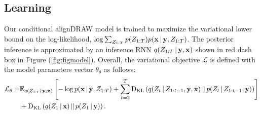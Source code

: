 \documentclass{article} %
\newcommand{\given}{\,|\,}
\newcommand{\expectation}{\mathbb{E}}
\newcommand{\kldiv}{\mathrm{D}_{\rm KL}}
\newcommand{\klBars}{\,\|\,}
\newcommand{\Lat}{Z}
\newcommand{\icaption}{{\bf{y}}}
\newcommand{\oimage}{{\bf{x}}}
\newcommand{\post}{q}
\newcommand{\prior}{p}
\newcommand{\loss}{\mathcal{L}}
\begin{document}
\subsection{Learning}

Our conditional alignDRAW model is trained to maximize the variational lower bound on the log-likelihood, $\log \sum_{\Lat_{1:T}} \prior(\Lat_{1:T})p(\oimage\given\icaption, \Lat_{1:T})$. The posterior inference is approximated by an inference RNN $\post(\Lat_{1:T}\given\icaption,\oimage)$ shown in red dash box in Figure (\ref{fig:figmodel}).   
Overall, the variational objective $\loss$ is defined with the model parameters vector $\theta_\theta$ as follows:
\begin{align}
\vspace{-0.1in}
\loss_\theta =  &\expectation_{\post(\Lat_{1:t}\given\icaption,\oimage)}\left[ - \log p(\oimage\given\icaption,\Lat_{1:T}) + \sum_{t=2}^T\kldiv\left(\post(\Lat_t\given\Lat_{1:t-1},\icaption,\oimage)\klBars\prior(\Lat_t\given\Lat_{1:t-1},\icaption)\right) \right] \nonumber \\& + \kldiv\left(\post(\Lat_1\given\oimage)\klBars\prior(\Lat_1\given\icaption)\right).
\end{align}
\end{document}
